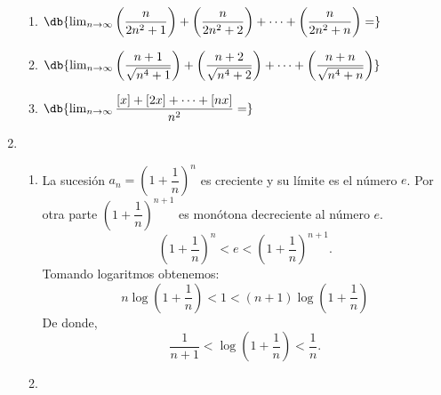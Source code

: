\begin{enumerate}[label=\color{red}\textbf{\arabic*)}, leftmargin=*]
\begin{enumerate}[label=\color{red}\arabic*)]
	\item $\db{\lim_{n\to\infty}\left(\dfrac{n}{2n^2+1}\right)+\left(\dfrac{n}{2n^2+2}\right)+\cdots+\left(\dfrac{n}{2n^2+n}\right)=}$
	\item $\db{\lim_{n\to\infty}\left(\dfrac{n+1}{\sqrt{n^4+1}}\right)+\left(\dfrac{n+2}{\sqrt{n^4+2}}\right)+\cdots+\left(\dfrac{n+n}{\sqrt{n^4+n}}\right)}$
	\item $\db{\lim_{n\to\infty}\dfrac{[x]+[2x]+\cdots+[nx]}{n^2}=}$
\end{enumerate}
\item {}
\begin{enumerate}[label=\color{red}\arabic*)]
	\item {}
	
	La sucesión $a_n=\left(1+\dfrac{1}{n}\right)^n$ es creciente y su límite es el número $e$. Por otra parte $\left(1+\dfrac{1}{n}\right)^{n+1}$ es monótona decreciente al número $e$. \[ \left(1+\dfrac{1}{n}\right)^n<e<\left(1+\dfrac{1}{n}\right)^{n+1}. \]Tomando logaritmos obtenemos: \[ n\log\left(1+\dfrac{1}{n}\right)<1<(n+1)\log\left(1+\dfrac{1}{n}\right) \]De donde, \[ \dfrac{1}{n+1}<\log\left(1+\dfrac{1}{n}\right)<\dfrac{1}{n}. \]
	\item {}
	

\end{enumerate}
\end{enumerate}
